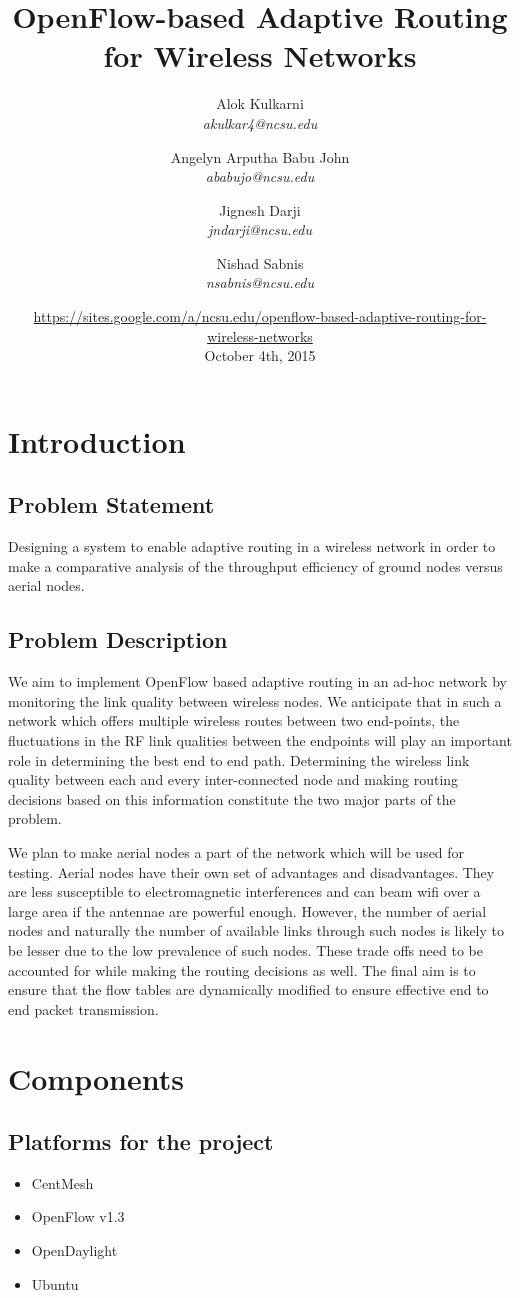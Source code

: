 \documentclass{article}
\title{OpenFlow-based Adaptive Routing for Wireless Networks}
\author{
    Alok Kulkarni \\
    \textit{akulkar4@ncsu.edu}
    \and
    Angelyn Arputha Babu John \\
    \textit{ababujo@ncsu.edu}
    \and
    Jignesh Darji \\
    \textit{jndarji@ncsu.edu}
    \and 
    Nishad Sabnis \\
    \textit{nsabnis@ncsu.edu}
}
\date{
    \small{\url{https://sites.google.com/a/ncsu.edu/openflow-based-adaptive-routing-for-wireless-networks}}\\
    October 4th, 2015}
\begin{document}
\maketitle
\section{Introduction}
\subsection{Problem Statement}
Designing a system to enable adaptive routing in a wireless network in order to make a comparative analysis of the
throughput efficiency of ground nodes versus aerial nodes.
\subsection{Problem Description}
\par We aim to implement OpenFlow based adaptive routing in an ad-hoc network by monitoring the link quality between wireless
nodes. We anticipate that in such a network which offers multiple wireless routes between two end-points, the
fluctuations in the RF link qualities between the endpoints will play an important role in determining the best end to
end path. Determining the wireless link quality between each and every inter-connected node and making routing decisions
based on this information constitute the two major parts of the problem. 
\par We plan to make aerial nodes a part of the network which will be used for testing. Aerial nodes have their own set of
advantages and disadvantages. They are less susceptible to electromagnetic interferences and can beam wifi over a large
area if the antennae are powerful enough. However, the number of aerial nodes and naturally the number of available
links through such nodes is likely to be lesser due to the low prevalence of such nodes. These trade offs need to be
accounted for while making the routing decisions as well. The final aim is to ensure that the flow tables are
dynamically modified to ensure effective end to end packet transmission. 
\section{Components}
\subsection{Platforms for the project}
\begin{itemize}
\item CentMesh
\item OpenFlow v1.3
\item OpenDaylight
\item Ubuntu
\end{itemize}
\end{document}
